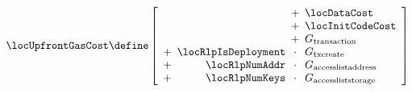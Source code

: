 	\[
		\locUpfrontGasCost \define
		\left[ \begin{array}{crcl}
                                 &                              & \!\!\!   +   \!\!\! & \locDataCost               \\
                                 &                              & \!\!\!   +   \!\!\! & \locInitCodeCost           \\
                                 &                              & \!\!\!   +   \!\!\! & G_{\text{transaction}}     \\
			+ \!\!\! & \locRlpIsDeployment          & \!\!\! \cdot \!\!\! & G_{\text{txcreate}}        \\
			+ \!\!\! & \locRlpNumAddr               & \!\!\! \cdot \!\!\! & G_\text{accesslistaddress} \\
			+ \!\!\! & \locRlpNumKeys               & \!\!\! \cdot \!\!\! & G_\text{accessliststorage} \\
		\end{array} \right] \\
\]
